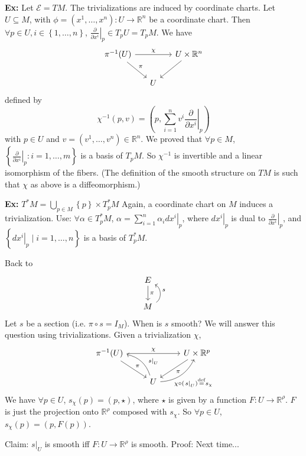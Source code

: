 \documentclass[10pt,letterpaper]{article}
\newcommand{\n}{\hfill\break}
\newcommand{\nn}{\vspace{0.5\baselineskip}\n}
\newcommand{\hangblock}[2]{\par\noindent\settowidth{\hangindent}{\textbf{#1: }}\textbf{#1: }\!\!\!#2}
\newcommand{\ex}[1]{\hangblock{Ex}{#1}}
\newcommand{\ptxt}[1]{\textrm{\textnormal{#1}}}
\newcommand{\set}[1]{\left\{#1\right\}}
\newcommand{\reals}{\mathbb{R}}
\newcommand{\R}{\reals}
\newcommand{\pdat}[3]{\left.\pd{#1}{#2}\right|_{#3}}
\newcommand{\inv}{^{-1}}
\newcommand{\of}{\circ}
\newcommand{\restr}[2]{\left.#1\right|_{#2}}
\newcommand{\pd}[2]{\frac{\partial{}#1}{\partial{}#2}}
\newcommand{\eqdef}{\overset{\ptxt{def}}{=}}
\newcommand{\paren}[1]{\left(#1\right)}
\begin{document}
\ex{
	Let $\mathcal{E}=TM$. The trivializations are induced by coordinate charts. Let $U\subseteq{}M$, with $\phi=(x^{1},\ldots,x^{n}):U\to\R^{n}$ be a coordinate chart. Then $\forall{}p\in{}U,i\in\set{1,\ldots,n}$, $\pdat{}{x^{i}}{p}\in{}T_{p}U=T_{p}M$. We have
	\[
		\begin{tikzcd}[ampersand replacement=\&]
			\pi\inv(U) \arrow[rr,"\chi"] \arrow[dr, "\pi"] \&[-10pt] \&[-10pt] U\times\R^{n} \arrow[dl]\\
			\& U
		\end{tikzcd}
	\]
	defined by
	\[
		\chi\inv(p,v)=\paren{p,\sum_{i=1}^{n}v^{i}\pdat{}{x^{i}}{p}}
	\]
	with $p\in{}U$ and $v=(v^{1},\ldots,v^{n})\in\R^{n}$.\n
	We proved that $\forall{}p\in{}M$, $\set{\pdat{}{x^{i}}{p}:i=1,\ldots,m}$ is a basis of $T_{p}M$. So $\chi\inv$ is invertible and a linear isomorphism of the fibers.\n
	(The definition of the smooth structure on $TM$ is such that $\chi$ as above is a diffeomorphism.)\n
}

\ex{
	$\displaystyle T^{*}M=\bigcup_{p\in{}M}\set{p}\times{}T_{p}^{*}M$\n
	Again, a coordinate chart on $M$ induces a trivialization.\n
	Use: $\forall\alpha\in{}T_{p}^{*}M$, $\alpha=\sum_{i=1}^{n}\alpha_{i}\restr{dx^{i}}{p}$, where $\restr{dx^{i}}{p}$ is dual to $\pdat{}{x^{i}}{p}$, and $\set{\restr{dx^{i}}{p}\mid{}i=1,\ldots,n}$ is a basis of $T_{p}^{*}M$.\n
}

\par\noindent
Back to
\[
	\begin{tikzcd}
		E \arrow[d,"\pi"]\\
		M \arrow[u, bend right=60, "s", swap]
	\end{tikzcd}
\]
Let $s$ be a section (i.e. $\pi\of{}s=I_{M}$). When is $s$ smooth? We will answer this question using trivializations. Given a trivialization $\chi$,
\[
	\begin{tikzcd}
		\pi\inv(U) \arrow[rr, "\chi"] \arrow[dr, "\pi"] & & U\times\R^{p} \arrow[dl, "\pi"]\\
		& U \arrow[ul, bend right=30, "\restr{s}{U}", swap, pos=0.3] \arrow[ur, bend right=30, "\hspace{-10pt}\chi\of(\restr{s}{U})\eqdef{}s_{\chi}", swap]
	\end{tikzcd}
\]
We have $\forall{}p\in{}U$, $s_{\chi}(p)=(p,\star)$, where $\star$ is given by a function $F:U\to\R^{\rho}$. $F$ is just the projection onto $\R^{\rho}$ composed with $s_{\chi}$. So $\forall{}p\in{}U$, $s_{\chi}(p)=(p,F(p))$.\n

\par\noindent
Claim: $\restr{s}{U}$ is smooth iff $F:U\to\R^{\rho}$ is smooth.\nn
Proof: Next time...
\end{document}
